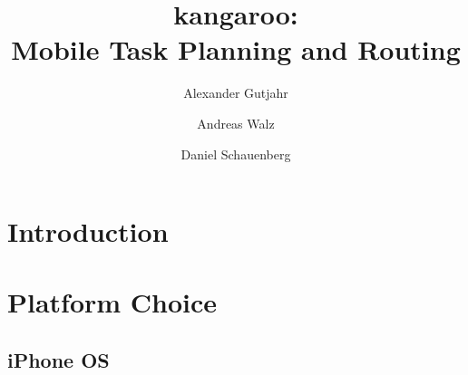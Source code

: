 \documentclass[11pt,a4paper]{scrreprt}
\begin{document}
\title{kangaroo: \\ Mobile Task Planning and Routing}
\author{Alexander Gutjahr \and Andreas Walz \and Daniel Schauenberg}

\maketitle

\tableofcontents

\chapter{Introduction} %
\label{chp:introduction}


\chapter{Platform Choice} %
\label{chp:platform_choice}
%

\section{iPhone OS} %
\label{sec:iphone}





%
%
\end{document}
